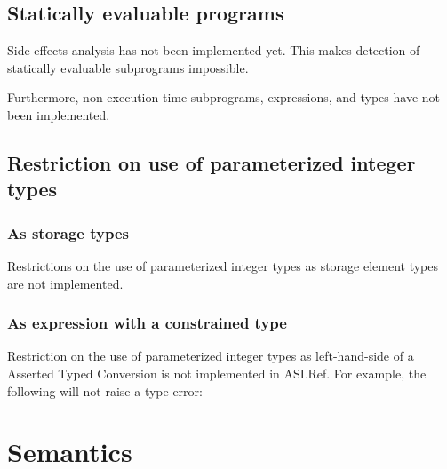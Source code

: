 \documentclass{book}
\begin{document}

\subsection{Statically evaluable programs}%
\label{sec:nyi:statically-evaluable-subprograms}

Side effects analysis has not been implemented yet.
%
This makes detection of statically evaluable subprograms impossible.

Furthermore, non-execution time subprograms, expressions, and types have not
been implemented.


\subsection{Restriction on use of parameterized integer types}

\subsubsection{As storage types}
Restrictions on the use of parameterized integer types as storage element types are not
implemented.


\subsubsection{As expression with a constrained type}

Restriction on the use of parameterized integer types as left-hand-side of a
Asserted Typed Conversion is not implemented in ASLRef.
%
For example, the following will not raise a type-error:


\section{Semantics}
\end{document}
